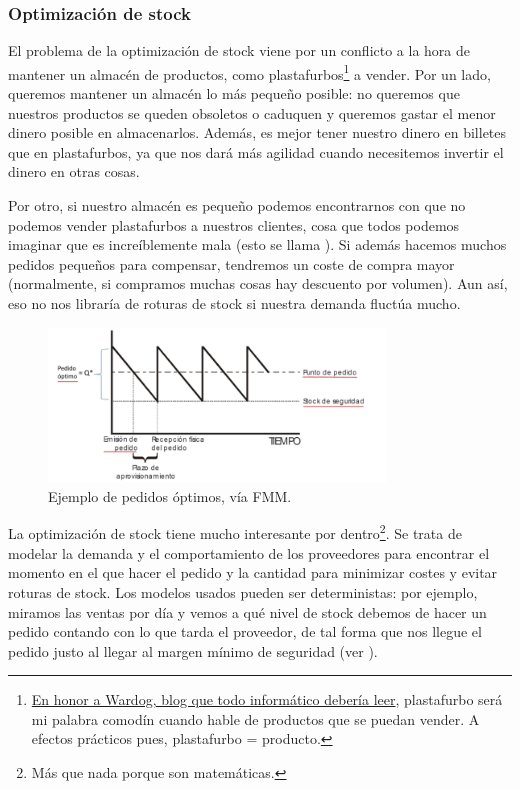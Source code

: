 \documentclass[nochap,palatino,notitlepage]{apuntes}
\begin{document}
\subsubsection{Optimización de stock}

El problema de la optimización de stock viene por un conflicto a la hora de mantener un almacén de productos, como plastafurbos\footnote{\href{http://mundowdg.com/blog/2009/04/16/adioshola/}{En honor a Wardog, blog que todo informático debería leer}, plastafurbo será mi palabra comodín cuando hable de productos que se puedan vender. A efectos prácticos pues, plastafurbo = producto.} a vender. Por un lado, queremos mantener un almacén lo más pequeño posible: no queremos que nuestros productos se queden obsoletos o caduquen y queremos gastar el menor dinero posible en almacenarlos. Además, es mejor tener nuestro dinero en billetes que en plastafurbos, ya que nos dará más agilidad cuando necesitemos invertir el dinero en otras cosas.

Por otro, si nuestro almacén es pequeño podemos encontrarnos con que no podemos vender plastafurbos a nuestros clientes, cosa que todos podemos imaginar que es increíblemente mala (esto se llama ). Si además hacemos muchos pedidos pequeños para compensar, tendremos un coste de compra mayor (normalmente, si compramos muchas cosas hay descuento por volumen). Aun así, eso no nos libraría de roturas de stock si nuestra demanda fluctúa mucho.

\begin{figure}[hbtp]
\centering
\includegraphics[width=0.8\textwidth]{img/ControlStock.png}
\caption{Ejemplo de pedidos óptimos, vía FMM.}
\label{fig:StockDeterminista}
\end{figure}

La optimización de stock tiene mucho interesante por dentro\footnote{Más que nada porque son matemáticas.}. Se trata de modelar la demanda y el comportamiento de los proveedores para encontrar el momento en el que hacer el pedido y la cantidad para minimizar costes y evitar roturas de stock. Los modelos usados pueden ser deterministas: por ejemplo, miramos las ventas por día y vemos a qué nivel de stock debemos de hacer un pedido contando con lo que tarda el proveedor, de tal forma que nos llegue el pedido justo al llegar al margen mínimo de seguridad (ver ).
\end{document}
